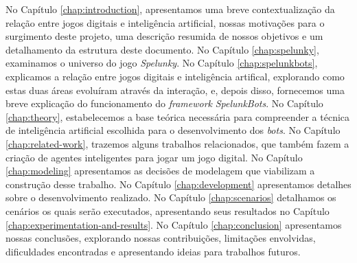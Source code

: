 No Capítulo \ref{chap:introduction}, apresentamos uma breve contextualização da
relação entre jogos digitais e inteligência artificial, nossas motivações para
o surgimento deste projeto, uma descrição resumida de nossos objetivos e um
detalhamento da estrutura deste documento. No Capítulo \ref{chap:spelunky},
examinamos o universo do jogo \textit{Spelunky}. No Capítulo
\ref{chap:spelunkbots}, explicamos a relação entre jogos digitais e
inteligência artifical, explorando como estas duas áreas evoluíram através da
interação, e, depois disso, fornecemos uma breve explicação do funcionamento do
\textit{framework} \textit{SpelunkBots}. No Capítulo \ref{chap:theory},
estabelecemos a base teórica necessária para compreender a técnica de
inteligência artificial escolhida para o desenvolvimento dos \textit{bots}. No
Capítulo \ref{chap:related-work}, trazemos alguns trabalhos relacionados, que
também fazem a criação de agentes inteligentes para jogar um jogo digital. No
Capítulo \ref{chap:modeling} apresentamos as decisões de modelagem que
viabilizam a construção desse trabalho. No Capítulo \ref{chap:development}
apresentamos detalhes sobre o desenvolvimento realizado.  No Capítulo
\ref{chap:scenarios} detalhamos os cenários os quais serão executados,
apresentando seus resultados no Capítulo
\ref{chap:experimentation-and-results}. No Capítulo \ref{chap:conclusion}
apresentamos nossas conclusões, explorando nossas contribuições, limitações
envolvidas, dificuldades encontradas e apresentando ideias para trabalhos
futuros.
